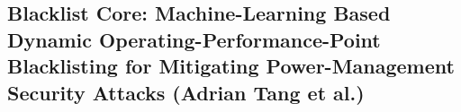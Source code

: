 \subsection{Blacklist Core: Machine-Learning Based Dynamic Operating-Performance-Point Blacklisting for Mitigating Power-Management Security Attacks (Adrian Tang et al.)}
